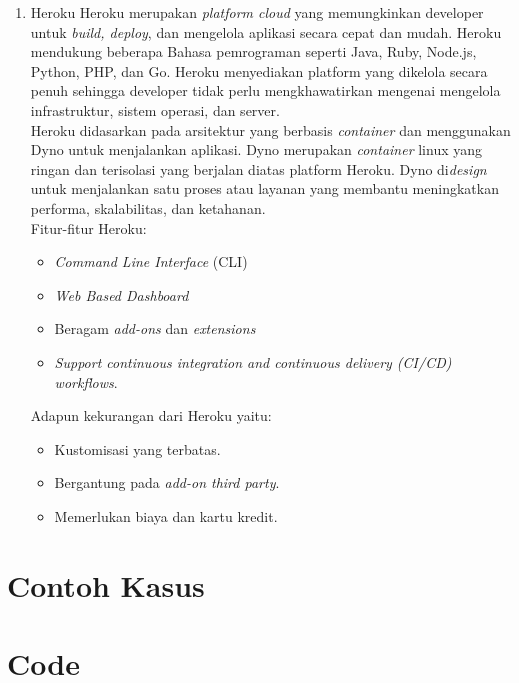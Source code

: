\begin{enumerate}
	\item Heroku
	Heroku merupakan \textit{platform cloud} yang memungkinkan developer untuk \textit{build, deploy}, dan mengelola aplikasi secara cepat dan mudah. Heroku mendukung beberapa Bahasa pemrograman seperti Java, Ruby, Node.js, Python, PHP, dan Go. Heroku menyediakan platform yang dikelola secara penuh sehingga developer tidak perlu mengkhawatirkan mengenai mengelola infrastruktur, sistem operasi, dan server.
	\\Heroku didasarkan pada arsitektur yang berbasis \textit{container} dan menggunakan Dyno untuk menjalankan aplikasi. Dyno merupakan \textit{container} linux yang ringan dan terisolasi yang berjalan diatas platform Heroku. Dyno di\textit{design} untuk menjalankan satu proses atau layanan yang membantu meningkatkan performa, skalabilitas, dan ketahanan.
	\\Fitur-fitur Heroku:
	\begin{itemize}
		\item \textit{Command Line Interface }(CLI)
		\item \textit{Web Based Dashboard}
		\item Beragam \textit{add-ons} dan \textit{extensions}
		\item\textit{ Support continuous integration and continuous delivery (CI/CD) workflows}.
	\end{itemize}
	Adapun kekurangan dari Heroku yaitu:
	\begin{itemize}
		\item Kustomisasi yang terbatas.
		\item Bergantung pada \textit{add-on third party}.
		\item Memerlukan biaya dan kartu kredit.
	\end{itemize}
\end{enumerate}
\section{Contoh Kasus}
\section{Code}
